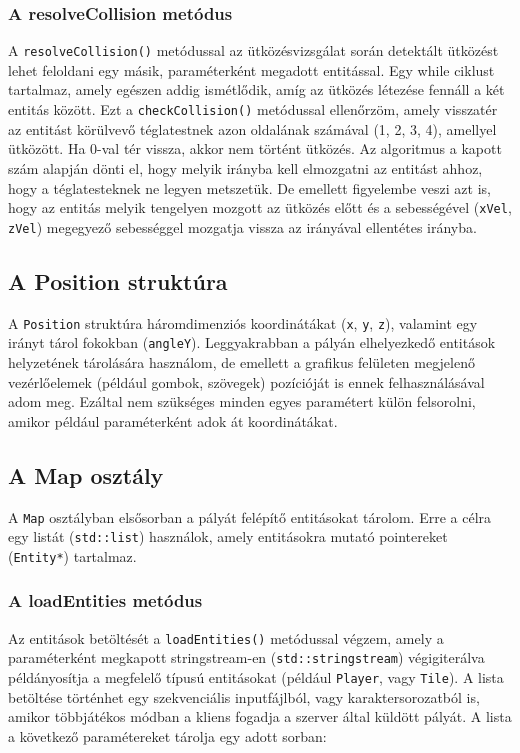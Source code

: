 \subsubsection{A resolveCollision metódus}

A \verb|resolveCollision()| metódussal az ütközésvizsgálat során detektált ütközést lehet feloldani egy másik, paraméterként megadott entitással. Egy while ciklust tartalmaz, amely egészen addig ismétlődik, amíg az ütközés létezése fennáll a két entitás között. Ezt a \verb|checkCollision()| metódussal ellenőrzöm, amely visszatér az entitást körülvevő téglatestnek azon oldalának számával (1, 2, 3, 4), amellyel ütközött. Ha 0-val tér vissza, akkor nem történt ütközés. Az algoritmus a kapott szám alapján dönti el, hogy melyik irányba kell elmozgatni az entitást ahhoz, hogy a téglatesteknek ne legyen metszetük. De emellett figyelembe veszi azt is, hogy az entitás melyik tengelyen mozgott az ütközés előtt és a sebességével (\verb|xVel|, \verb|zVel|) megegyező sebességgel mozgatja vissza az irányával ellentétes irányba.

\subsection{A Position struktúra}

A \verb|Position| struktúra háromdimenziós koordinátákat (\verb|x|, \verb|y|, \verb|z|), valamint egy irányt tárol fokokban (\verb|angleY|). Leggyakrabban a pályán elhelyezkedő entitások helyzetének tárolására használom, de emellett a grafikus felületen megjelenő vezérlőelemek (például gombok, szövegek) pozícióját is ennek felhasználásával adom meg. Ezáltal nem szükséges minden egyes paramétert külön felsorolni, amikor például paraméterként adok át koordinátákat.

\subsection{A Map osztály}

A \verb|Map| osztályban elsősorban a pályát felépítő entitásokat tárolom. Erre a célra egy listát (\verb|std::list|) használok, amely entitásokra mutató pointereket (\verb|Entity*|) tartalmaz.

\subsubsection{A loadEntities metódus}

Az entitások betöltését a \verb|loadEntities()| metódussal végzem, amely a paraméterként megkapott stringstream-en (\verb|std::stringstream|) végigiterálva példányosítja a megfelelő típusú entitásokat (például \verb|Player|, vagy \verb|Tile|). A lista betöltése történhet egy szekvenciális inputfájlból, vagy karaktersorozatból is, amikor többjátékos módban a kliens fogadja a szerver által küldött pályát. A lista a következő paramétereket tárolja egy adott sorban:

